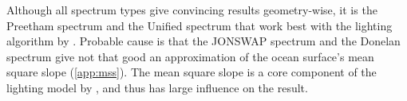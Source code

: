%



Although all spectrum types give convincing results geometry-wise, it is the
Preetham spectrum and the Unified spectrum that work best with the lighting
algorithm by \cite{article:oceanlighting}. Probable cause is that the JONSWAP
spectrum and the Donelan spectrum give not that good an approximation of the
ocean surface's mean square slope (\ref{app:mss}). The mean square slope is a
core component of the lighting model by \cite{article:oceanlighting}, and thus
has large influence on the result.

